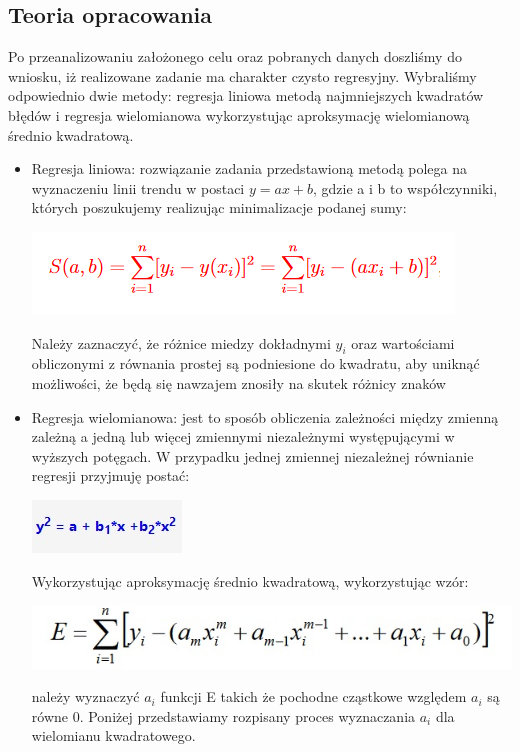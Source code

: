 \documentclass{article}
\begin{document}
\subsection{Teoria opracowania}
\qquad Po przeanalizowaniu założonego celu oraz pobranych danych doszliśmy do wniosku, iż  realizowane zadanie ma charakter czysto regresyjny. Wybraliśmy odpowiednio dwie metody: regresja liniowa metodą najmniejszych kwadratów błędów i regresja wielomianowa wykorzystując aproksymację wielomianową średnio kwadratową.
\begin{itemize}
    \item Regresja liniowa:
    rozwiązanie zadania przedstawioną metodą polega na wyznaczeniu linii trendu w postaci $y=ax+b$, gdzie a i b to współczynniki, których poszukujemy realizując minimalizacje podanej sumy:
    \begin{center}
       \includegraphics{sumareglin} 
    \end{center}
Należy zaznaczyć, że różnice miedzy dokładnymi ${y_i}$ oraz wartościami obliczonymi z równania prostej są podniesione do kwadratu, aby uniknąć możliwości, że będą się nawzajem znosiły na skutek różnicy znaków
    \item Regresja wielomianowa: jest to sposób obliczenia zależności między zmienną zależną a jedną lub więcej zmiennymi niezależnymi występującymi w wyższych potęgach. W przypadku jednej zmiennej niezależnej równianie regresji przyjmuję postać:
    \begin{center}
       \includegraphics{regwiel1.jpg} 
    \end{center}
    Wykorzystując aproksymację średnio kwadratową, wykorzystując wzór:
    \begin{center}
       \includegraphics[scale=0.5]{regwiel2.jpg} 
    \end{center}
    należy wyznaczyć $a_i$ funkcji E takich że pochodne cząstkowe względem $a_i$ są równe 0. Poniżej przedstawiamy rozpisany proces wyznaczania $a_i$ dla wielomianu kwadratowego.

\end{itemize}
\end{document}
